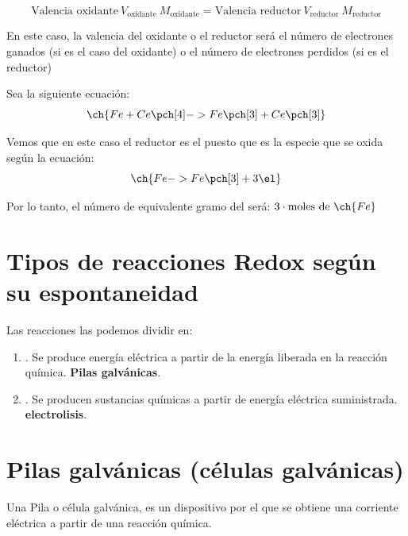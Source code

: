    \begin{equation*}
        \text{Valencia oxidante}\ V_{\text{oxidante}} \ M_{\text{oxidante}} = \text{Valencia reductor}\ V_{\text{reductor}} \ M_{\text{reductor}}
    \end{equation*}

    En este caso, la valencia del oxidante o el reductor será el número de electrones ganados (si es el caso del oxidante) o el número de electrones perdidos (si es el reductor)

    Sea la siguiente ecuación:
    \begin{equation*}
        \ch{Fe + Ce\pch[4] -> Fe\pch[3] + Ce\pch[3]}
    \end{equation*}

    Vemos que en este caso el reductor es el  puesto que es la especie que se oxida según la ecuación:
    \begin{equation*}
        \ch{Fe -> Fe\pch[3] + 3 \el}
    \end{equation*}

    Por lo tanto, el número de equivalente gramo del   será: \(3\cdot \text{moles de } \ch{Fe}\)


    \section{Tipos de reacciones Redox según su espontaneidad}\label{sec:tipos-de-reacciones-redox-segun-su-espontaneidad}

    Las reacciones las podemos dividir en:

    \begin{enumerate}[label=\numberballmDarkTeal]
        \item {}.
        Se produce energía eléctrica a partir de la energía liberada en la reacción química. \textbf{Pilas galvánicas}.
        \item {}.
        Se producen sustancias químicas a partir de energía eléctrica suministrada. \textbf{electrolisis}.
    \end{enumerate}


    \section{Pilas galvánicas (células galvánicas)}\label{sec:pilas-galvanicas-(celulas-galvanicas)}

    Una Pila o célula galvánica, es un dispositivo por el que se obtiene una corriente eléctrica a partir de una reacción química.

